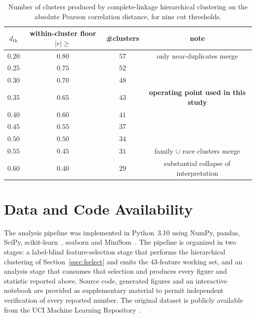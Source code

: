 \documentclass{ieeeaccess}
\begin{document}
\begin{table}[!t]
\caption{Number of clusters produced by complete-linkage hierarchical clustering on the absolute Pearson correlation distance, for nine cut thresholds.}
\label{tab:sweep}
\centering
\small
\begin{tabular}{cccc}
\toprule
$d_{\mathrm{th}}$ & within-cluster floor $|r|\geq$ & \#clusters & note \\
\midrule
$0.20$ & $0.80$ & $57$ & only near-duplicates merge \\
$0.25$ & $0.75$ & $52$ & \\
$0.30$ & $0.70$ & $48$ & \\
$0.35$ & $0.65$ & $43$ & \textbf{operating point used in this study} \\
$0.40$ & $0.60$ & $41$ & \\
$0.45$ & $0.55$ & $37$ & \\
$0.50$ & $0.50$ & $34$ & \\
$0.55$ & $0.45$ & $31$ & family $\cup$ race clusters merge \\
$0.60$ & $0.40$ & $29$ & substantial collapse of interpretation \\
\bottomrule
\end{tabular}
\end{table}

\section{Data and Code Availability}
\label{app:repro}
The analysis pipeline was implemented in Python~3.10 using NumPy, pandas, SciPy, scikit-learn~\cite{pedregosa}, seaborn and MiniSom~\cite{minisom}. The pipeline is organized in two stages: a label-blind feature-selection stage that performs the hierarchical clustering of Section~\ref{ssec:fselect} and emits the $43$-feature working set, and an analysis stage that consumes that selection and produces every figure and statistic reported above. Source code, generated figures and an interactive notebook are provided as supplementary material to permit independent verification of every reported number. The original dataset is publicly available from the UCI Machine Learning Repository~\cite{uciccrime}.
\end{document}
